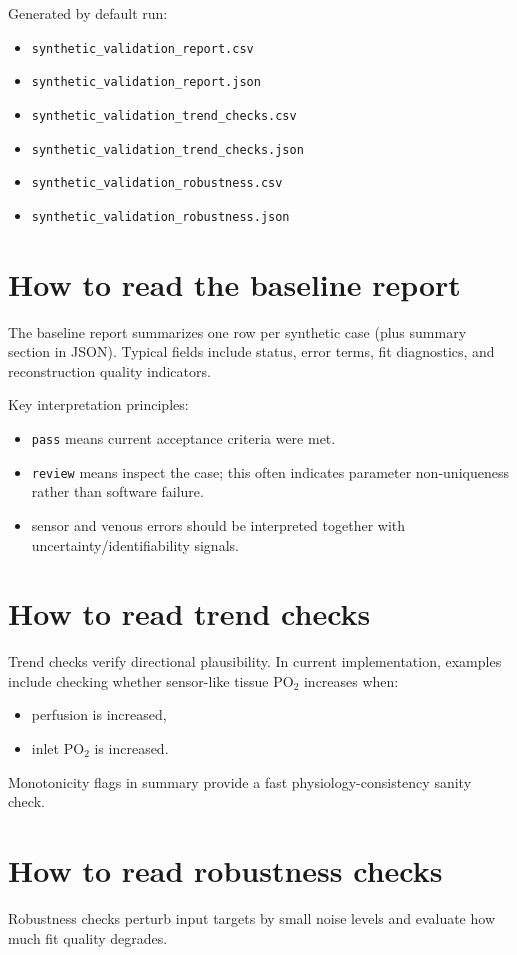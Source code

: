 \documentclass[12pt,a4paper]{article}
\begin{document}
Generated by default run:
\begin{itemize}
    \item \texttt{synthetic\_validation\_report.csv}
    \item \texttt{synthetic\_validation\_report.json}
    \item \texttt{synthetic\_validation\_trend\_checks.csv}
    \item \texttt{synthetic\_validation\_trend\_checks.json}
    \item \texttt{synthetic\_validation\_robustness.csv}
    \item \texttt{synthetic\_validation\_robustness.json}
\end{itemize}

\section{How to read the baseline report}
The baseline report summarizes one row per synthetic case (plus summary section in JSON). Typical fields include status, error terms, fit diagnostics, and reconstruction quality indicators.

Key interpretation principles:
\begin{itemize}
    \item \texttt{pass} means current acceptance criteria were met.
    \item \texttt{review} means inspect the case; this often indicates parameter non-uniqueness rather than software failure.
    \item sensor and venous errors should be interpreted together with uncertainty/identifiability signals.
\end{itemize}

\section{How to read trend checks}
Trend checks verify directional plausibility. In current implementation, examples include checking whether sensor-like tissue PO$_2$ increases when:
\begin{itemize}
    \item perfusion is increased,
    \item inlet PO$_2$ is increased.
\end{itemize}

Monotonicity flags in summary provide a fast physiology-consistency sanity check.

\section{How to read robustness checks}
Robustness checks perturb input targets by small noise levels and evaluate how much fit quality degrades.
\end{document}
